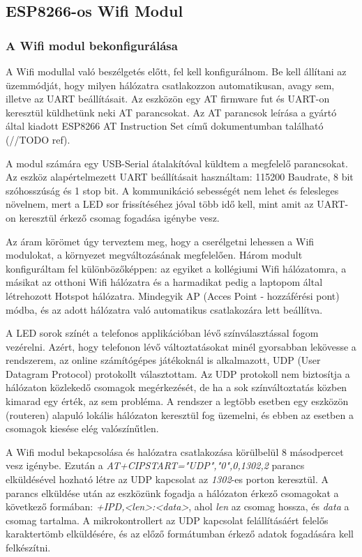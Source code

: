 \documentclass[../main.tex]{subfiles}
\begin{document}
    \subsection{ESP8266-os Wifi Modul}
        \subsubsection{A Wifi modul bekonfigurálása}
            A Wifi modullal való beszélgetés előtt, fel kell konfigurálnom. Be kell állítani az üzemmódját, hogy milyen hálózatra csatlakozzon automatikusan, avagy sem, illetve az UART beállításait. Az eszközön egy AT firmware fut és UART-on keresztül küldhetünk neki AT parancsokat. Az AT parancsok leírása a gyártó által kiadott ESP8266 AT Instruction Set című dokumentumban található (//TODO ref).
            
            A modul számára egy USB-Serial átalakítóval küldtem a megfelelő parancsokat. Az eszköz alapértelmezett UART beállításait használtam: 115200 Baudrate, 8 bit szóhosszúság és 1 stop bit. A kommunikáció sebességét nem lehet és felesleges növelnem, mert a LED sor frissítéséhez jóval több idő kell, mint amit az UART-on keresztül érkező csomag fogadása igénybe vesz.
            
            Az áram körömet úgy terveztem meg, hogy a cserélgetni lehessen a Wifi modulokat, a környezet megváltozásának megfelelően. Három modult konfiguráltam fel különbözőképpen: az egyiket a kollégiumi Wifi hálózatomra, a másikat az otthoni Wifi hálózatra és a harmadikat pedig a laptopom által létrehozott Hotspot hálózatra. Mindegyik AP (Acces Point - hozzáférési pont) módba, és az adott hálózatra való automatikus csatlakozára lett beállítva.
            
            A LED sorok színét a telefonos applikációban lévő színválasztással fogom vezérelni. Azért, hogy telefonon lévő változtatásokat minél gyorsabban lekövesse a rendszerem, az online számítógépes játékoknál is alkalmazott, UDP (User Datagram Protocol) protokollt választottam. Az UDP protokoll nem biztosítja a hálózaton közlekedő csomagok megérkezését, de ha a sok színváltoztatás közben kimarad egy érték, az sem probléma. A rendszer a legtöbb esetben egy eszközön (routeren) alapuló lokális hálózaton keresztül fog üzemelni, és ebben az esetben a csomagok kiesése elég valószínűtlen.
            
            A Wifi modul bekapcsolása és halózatra csatlakozása körülbelül 8 másodpercet vesz igénybe. Ezután a \textit{AT+CIPSTART="UDP","0",0,1302,2} parancs elküldésével hozható létre az UDP kapcsolat az \textit{1302}-es porton keresztül. A parancs elküldése után az eszközünk fogadja a hálózaton érkező csomagokat a következő formában: \textit{+IPD,<len>:<data>}, ahol \textit{len} az csomag hossza, és \textit{data} a csomag tartalma. A mikrokontrollert az UDP kapcsolat felállításáért felelős karaktertömb elküldésére, és az előző formátumban érkező adatok fogadására kell felkészítni. 
        
\end{document}
